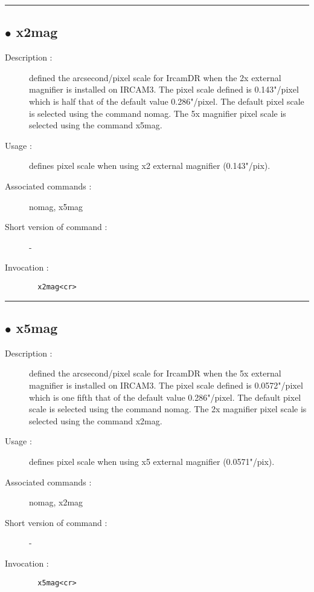 \hrule \subsection*{$\bullet$ x2mag}
\begin{description}
\item[Description :] defined the arcsecond/pixel scale for IrcamDR when the 2x external
magnifier is installed on {\sc IRCAM3}.  The pixel scale defined is
0.143"/pixel which is half that of the default value 0.286"/pixel.  The
default pixel scale is selected using the command nomag.  The 5x
magnifier pixel scale is selected using the command x5mag.
\item[Usage :] defines pixel scale when using x2 external magnifier
(0.143"/pix).
\item[Associated commands :] nomag, x5mag
\item[Short version of command :] -
\item[Invocation :]

\verb+  x2mag<cr> +\end{description}

\hrule \subsection*{$\bullet$ x5mag}
\begin{description}
\item[Description :] defined the arcsecond/pixel scale for IrcamDR when the 5x external
magnifier is installed on {\sc IRCAM3}.  The pixel scale defined is
0.0572"/pixel which is one fifth that of the default value 0.286"/pixel.
The default pixel scale is selected using the command nomag.  The 2x
magnifier pixel scale is selected using the command x2mag.
\item[Usage :] defines pixel scale when using x5 external magnifier
(0.0571"/pix).
\item[Associated commands :] nomag, x2mag
\item[Short version of command :] -
\item[Invocation :]

\verb+  x5mag<cr> +\end{description}

